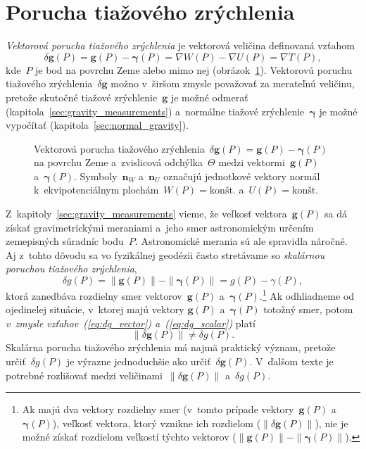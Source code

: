 \documentclass[a4paper, 12pt]{book}
\let\vec\mathbf
\begin{document}
\section{Porucha tiažového zrýchlenia}
\label{sec:gravity_disturbance}

\emph{Vektorová porucha tiažového zrýchlenia} je vektorová veličina definovaná 
vzťahom
%
\begin{equation}
\label{eq:dg_vector}
\delta \vec g(P) = \vec g(P) - \boldsymbol \gamma(P) = \nabla W(P) - \nabla 
U(P) = \nabla T(P){,}
\end{equation}
%
kde~$P$ je bod na povrchu Zeme alebo mimo nej 
(obrázok~\ref{fig:gravity_disturbance}).  Vektorovú poruchu tiažového 
zrýchlenia~$\delta \vec g$ možno v~širšom zmysle považovať za merateľnú 
veličinu, pretože skutočné tiažové zrýchlenie~$\vec g$ je možné odmerať 
(kapitola~\ref{sec:gravity_measurements}) a~normálne tiažové 
zrýchlenie~$\boldsymbol\gamma$ je možné vypočítať 
(kapitola~\ref{sec:normal_gravity}).

\begin{figure}
\centering

\caption{Vektorová porucha tiažového zrýchlenia~$\delta \vec g(P) = \vec g(P) 
- \boldsymbol\gamma(P)$ na povrchu Zeme a~zvislicová odchýlka~$\Theta$ medzi 
vektormi~$\vec g(P)$ a~$\boldsymbol\gamma(P)$.  Symboly~$\vec n_W$ a~$\vec n_U$ 
označujú jednotkové vektory normál k~ekvipotenciálnym plochám~$W(P) 
= \textrm{kon\v{s}t.}$ a~$U(P) = \textrm{kon\v{s}t.}$}
\label{fig:gravity_disturbance}
\end{figure}

Z~kapitoly~\ref{sec:gravity_measurements} vieme, že veľkosť vektora~$\vec g(P)$ 
sa dá získať gravimetrickými meraniami a~jeho smer astronomickým určením 
zemepisných súradníc bodu~$P$.  Astronomické merania sú ale spravidla náročné.  
Aj z~tohto dôvodu sa vo fyzikálnej geodézii často stretávame so \emph{skalárnou 
poruchou tiažového zrýchlenia},
%
\begin{equation}
\label{eq:dg_scalar}
\delta g(P) = \| \vec g(P) \| - \| \boldsymbol \gamma(P) \| = g(P) 
- \gamma(P){,}
\end{equation}
%
ktorá zanedbáva rozdielny smer vektorov~$\vec g(P)$ a~$\boldsymbol 
\gamma(P)$.\footnote{Ak majú dva vektory rozdielny smer (v~tomto prípade 
vektory~$\vec g(P)$ a~$\boldsymbol \gamma(P)$), veľkosť vektora, ktorý vznikne 
ich rozdielom ($\| \delta \vec g(P) \|$), nie je možné získať rozdielom 
veľkostí týchto vektorov ($\| \vec g(P) \| - \| \boldsymbol \gamma(P) \|$).}  
Ak odhliadneme od ojedinelej situácie, v~ktorej majú vektory $\vec g(P)$ 
a~$\boldsymbol{\gamma}(P)$ totožný smer, potom \emph{v~zmysle 
vzťahov~(\ref{eq:dg_vector}) a~(\ref{eq:dg_scalar})} platí
%
\begin{equation}
\| \delta \vec g(P) \| \neq \delta g(P){.}
\end{equation}
%
Skalárna porucha tiažového zrýchlenia má najmä praktický význam, pretože 
určiť~$\delta g(P)$ je výrazne jednoduchšie ako určiť~$\delta \vec g(P)$.  
V~ďalšom texte je potrebné rozlišovať medzi veličinami~$\| \delta \vec g(P) \|$ 
a~$\delta g(P)$.
\end{document}
